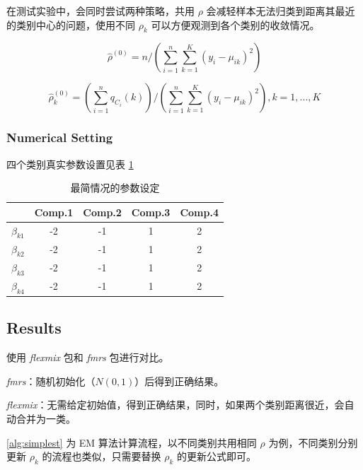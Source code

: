 \documentclass[12pt, a4paper, oneside]{article}
\numberwithin{equation}{section}
\begin{document}
在测试实验中，会同时尝试两种策略，共用 $\rho$ 会减轻样本无法归类到距离其最近的类别中心的问题，使用不同 $\rho_k$ 可以方便观测到各个类别的收敛情况。

\begin{equation}
	\hat\rho^{(0)} = n/\left(\sum_{i=1}^{n}\sum_{k=1}^{K}(y_i - \mu_{ik})^2\right)
	\label{eq:update-rho-same}
\end{equation}

\begin{equation}
	\hat\rho_k^{(0)} = \left(\sum_{i=1}^{n}q_{C_i}(k)\right)/\left(\sum_{i=1}^{n}\sum_{k=1}^{K}(y_i - \mu_{ik})^2\right), k=1,...,K
	\label{eq:update-rho-different}
\end{equation}

\subsubsection{Numerical Setting}

四个类别真实参数设置见表 \ref{tb:coef_true_simple}

\begin{table}[h]
	\centering
	\caption{最简情况的参数设定}
	\begin{tabular}{ccccc}
		\toprule
		& Comp.1 & Comp.2 & Comp.3 & Comp.4 \\
		\midrule
		$\beta_{k1}$  & -2      & -1      & 1      & 2     \\
		$\beta_{k2}$  & -2      & -1      & 1      & 2     \\
		$\beta_{k3}$  & -2      & -1      & 1      & 2      \\
		$\beta_{k4}$  & -2      & -1      & 1      & 2      \\
		\bottomrule
	\end{tabular}
	\label{tb:coef_true_simple}
\end{table}

\subsection{Results}

使用 \textit{flexmix} 包和 \textit{fmrs} 包进行对比。

\textit{fmrs}：随机初始化（$N(0,1)$）后得到正确结果。

\textit{flexmix}：无需给定初始值，得到正确结果，同时，如果两个类别距离很近，会自动合并为一类。

\ref{alg:simplest}  为 EM 算法计算流程，以不同类别共用相同 $\rho$ 为例，不同类别分别更新 $\rho_k$ 的流程也类似，只需要替换 $\rho_k$ 的更新公式即可。
\end{document}
